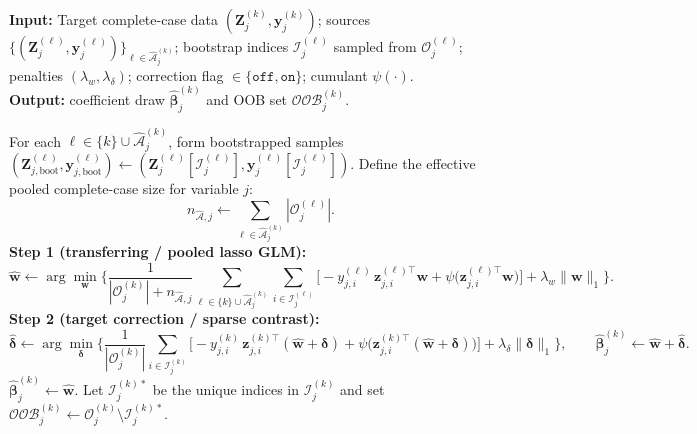\documentclass[12pt]{article}
\begin{document}
\begin{algorithm}[H]
\footnotesize
\caption{Bootstrap $\widehat{\mathcal{A}}$-Trans-GLM fit for a single conditional model $(k,j)$}
\label{alg:atransglm_boot}
\textbf{Input:} Target complete-case data $(\bm{Z}^{(k)}_j,\bm{y}^{(k)}_j)$; sources
$\{(\bm{Z}^{(\ell)}_j,\bm{y}^{(\ell)}_j)\}_{\ell\in\widehat{\mathcal{A}}^{(k)}_j}$; bootstrap indices
$\mathcal{I}^{(\ell)}_j$ sampled from $\mathcal{O}^{(\ell)}_j$; penalties $(\lambda_w,\lambda_\delta)$;
correction flag $\in\{\texttt{off},\texttt{on}\}$; cumulant $\psi(\cdot)$.\\
\textbf{Output:} coefficient draw $\hat{\bm{\beta}}^{(k)}_j$ and OOB set $\mathcal{OOB}^{(k)}_j$.
\begin{algorithmic}[1]
\State For each $\ell\in\{k\}\cup\widehat{\mathcal{A}}^{(k)}_j$, form bootstrapped samples
$(\bm{Z}^{(\ell)}_{j,\mathrm{boot}},\bm{y}^{(\ell)}_{j,\mathrm{boot}})
\leftarrow (\bm{Z}^{(\ell)}_j[\mathcal{I}^{(\ell)}_j],\bm{y}^{(\ell)}_j[\mathcal{I}^{(\ell)}_j])$.
\State Define the effective pooled complete-case size for variable $j$:
\[
n_{\widehat{\mathcal{A}},j}\leftarrow \sum_{\ell\in\widehat{\mathcal{A}}^{(k)}_j}|\mathcal{O}^{(\ell)}_j|.
\]
\State \textbf{Step 1 (transferring / pooled lasso GLM):}
\[
\hat{\bm{w}} \leftarrow \arg\min_{\bm{w}}
\Bigg\{
\frac{1}{|\mathcal{O}^{(k)}_j|+n_{\widehat{\mathcal{A}},j}}
\sum_{\ell\in\{k\}\cup\widehat{\mathcal{A}}^{(k)}_j}
\sum_{i\in \mathcal{I}^{(\ell)}_j}
\Big[-y^{(\ell)}_{j,i}\,\bm{z}^{(\ell)\top}_{j,i}\bm{w}
+\psi\!\big(\bm{z}^{(\ell)\top}_{j,i}\bm{w}\big)\Big]
+\lambda_w\|\bm{w}\|_1
\Bigg\}.
\]
  \State \textbf{Step 2 (target correction / sparse contrast):}
  \[
  \hat{\bm{\delta}} \leftarrow \arg\min_{\bm{\delta}}
  \Bigg\{
  \frac{1}{|\mathcal{O}^{(k)}_j|}\sum_{i\in \mathcal{I}^{(k)}_j}
  \Big[-y^{(k)}_{j,i}\,\bm{z}^{(k)\top}_{j,i}(\hat{\bm{w}}+\bm{\delta})
      +\psi\!\big(\bm{z}^{(k)\top}_{j,i}(\hat{\bm{w}}+\bm{\delta})\big)\Big]
  +\lambda_\delta\|\bm{\delta}\|_1
  \Bigg\},
  \qquad \hat{\bm{\beta}}^{(k)}_j\leftarrow \hat{\bm{w}}+\hat{\bm{\delta}}.
  \]
\Else
  \State $\hat{\bm{\beta}}^{(k)}_j\leftarrow \hat{\bm{w}}$.
\EndIf
\State Let $\mathcal{I}^{(k)\ast}_j$ be the unique indices in $\mathcal{I}^{(k)}_j$ and set
$\mathcal{OOB}^{(k)}_j \leftarrow \mathcal{O}^{(k)}_j \setminus \mathcal{I}^{(k)\ast}_j$.
\end{algorithmic}
\end{algorithm}
\end{document}
